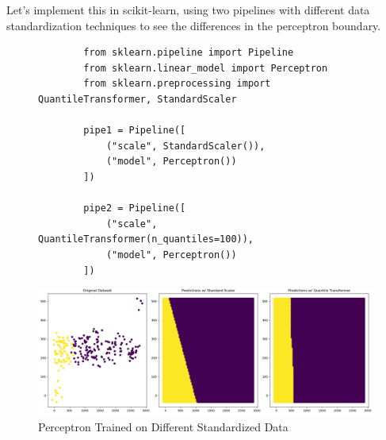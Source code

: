   \begin{code}
    Let's implement this in scikit-learn, using two pipelines with different data standardization techniques to see the differences in the perceptron boundary. 

    \begin{figure}[H]
      \centering 
      \begin{lstlisting}
        from sklearn.pipeline import Pipeline 
        from sklearn.linear_model import Perceptron
        from sklearn.preprocessing import QuantileTransformer, StandardScaler

        pipe1 = Pipeline([ 
            ("scale", StandardScaler()), 
            ("model", Perceptron())
        ])

        pipe2 = Pipeline([
            ("scale", QuantileTransformer(n_quantiles=100)), 
            ("model", Perceptron())
        ])
      \end{lstlisting}
      \caption{} 
    \end{figure}

    \begin{figure}[H]
      \centering
      \includegraphics[scale=0.35]{img/Perceptron.png}
      \caption{Perceptron Trained on Different Standardized Data}
    \end{figure}
  \end{code}

